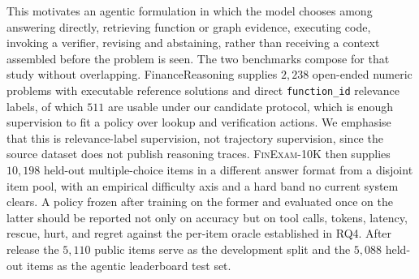 This motivates an agentic formulation in which the model chooses among answering directly,
retrieving function or graph evidence, executing code, invoking a verifier, revising and
abstaining, rather than receiving a context assembled before the problem is seen. The two
benchmarks compose for that study without overlapping. FinanceReasoning supplies $2{,}238$
open-ended numeric problems with executable reference solutions and direct \texttt{function\_id}
relevance labels, of which $511$ are usable under our candidate protocol, which is enough
supervision to fit a policy over lookup and verification actions. We emphasise that this is
relevance-label supervision, not trajectory supervision, since the source dataset does not
publish reasoning traces. \textsc{FinExam-10K} then supplies $10{,}198$ held-out multiple-choice
items in a different answer format from a disjoint item pool, with an empirical difficulty axis
and a hard band no current system clears. A policy frozen after training on the former and
evaluated once on the latter should be reported not only on accuracy but on tool calls, tokens,
latency, rescue, hurt, and regret against the per-item oracle established in RQ4. After release
the $5{,}110$ public items serve as the development split and the $5{,}088$ held-out items as the
agentic leaderboard test set.
